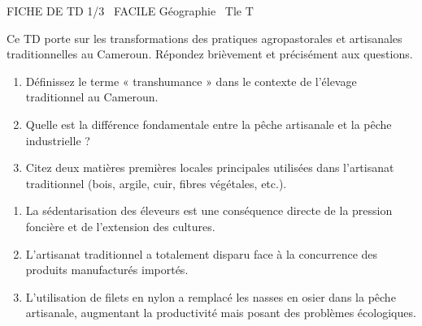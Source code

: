 \documentclass[11pt]{article}
\begin{document}
\begin{tcolorbox}[enhanced,colback=popink,colframe=popink,arc=10pt,boxrule=0pt,left=12pt,right=12pt,top=9pt,bottom=9pt]
{\color{white}\popxbold\small FICHE DE TD 1/3 \textbullet\ FACILE \hfill Géographie \textbullet\ Tle T\par}
\end{tcolorbox}
\vspace{4pt}
Ce TD porte sur les transformations des pratiques agropastorales et artisanales traditionnelles au Cameroun. Répondez brièvement et précisément aux questions.

\begin{exercice}
\begin{enumerate}
    \item Définissez le terme « transhumance » dans le contexte de l'élevage traditionnel au Cameroun.
    \item Quelle est la différence fondamentale entre la pêche artisanale et la pêche industrielle ?
    \item Citez deux matières premières locales principales utilisées dans l'artisanat traditionnel (bois, argile, cuir, fibres végétales, etc.).
\end{enumerate}
\end{exercice}

\begin{exercice}
\begin{enumerate}
    \item La sédentarisation des éleveurs est une conséquence directe de la pression foncière et de l'extension des cultures.
    \item L'artisanat traditionnel a totalement disparu face à la concurrence des produits manufacturés importés.
    \item L'utilisation de filets en nylon a remplacé les nasses en osier dans la pêche artisanale, augmentant la productivité mais posant des problèmes écologiques.
\end{enumerate}
\end{exercice}
\end{document}
